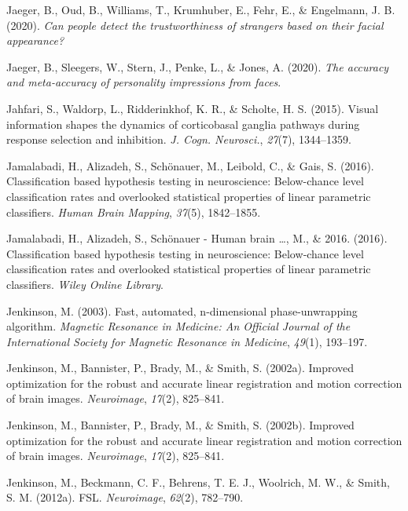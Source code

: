 \documentclass[11pt,american,a4paper,oneside,]{memoir} %
\begin{document}
\leavevmode\hypertarget{ref-Jaeger2020-sr}{}%
Jaeger, B., Oud, B., Williams, T., Krumhuber, E., Fehr, E., \& Engelmann, J. B. (2020). \emph{Can people detect the trustworthiness of strangers based on their facial appearance?}

\leavevmode\hypertarget{ref-Jaeger2020-bn}{}%
Jaeger, B., Sleegers, W., Stern, J., Penke, L., \& Jones, A. (2020). \emph{The accuracy and meta-accuracy of personality impressions from faces}.

\leavevmode\hypertarget{ref-Jahfari2015-ix}{}%
Jahfari, S., Waldorp, L., Ridderinkhof, K. R., \& Scholte, H. S. (2015). Visual information shapes the dynamics of corticobasal ganglia pathways during response selection and inhibition. \emph{J. Cogn. Neurosci.}, \emph{27}(7), 1344--1359.

\leavevmode\hypertarget{ref-jamalabadi2016classification}{}%
Jamalabadi, H., Alizadeh, S., Schönauer, M., Leibold, C., \& Gais, S. (2016). Classification based hypothesis testing in neuroscience: Below-chance level classification rates and overlooked statistical properties of linear parametric classifiers. \emph{Human Brain Mapping}, \emph{37}(5), 1842--1855.

\leavevmode\hypertarget{ref-Jamalabadi2016-gr}{}%
Jamalabadi, H., Alizadeh, S., Schönauer - Human brain \ldots, M., \& 2016. (2016). Classification based hypothesis testing in neuroscience: Below‐chance level classification rates and overlooked statistical properties of linear parametric classifiers. \emph{Wiley Online Library}.

\leavevmode\hypertarget{ref-jenkinson2003fast}{}%
Jenkinson, M. (2003). Fast, automated, n-dimensional phase-unwrapping algorithm. \emph{Magnetic Resonance in Medicine: An Official Journal of the International Society for Magnetic Resonance in Medicine}, \emph{49}(1), 193--197.

\leavevmode\hypertarget{ref-jenkinson2002improved}{}%
Jenkinson, M., Bannister, P., Brady, M., \& Smith, S. (2002a). Improved optimization for the robust and accurate linear registration and motion correction of brain images. \emph{Neuroimage}, \emph{17}(2), 825--841.

\leavevmode\hypertarget{ref-Jenkinson2002-wm}{}%
Jenkinson, M., Bannister, P., Brady, M., \& Smith, S. (2002b). Improved optimization for the robust and accurate linear registration and motion correction of brain images. \emph{Neuroimage}, \emph{17}(2), 825--841.

\leavevmode\hypertarget{ref-Jenkinson2012-ui}{}%
Jenkinson, M., Beckmann, C. F., Behrens, T. E. J., Woolrich, M. W., \& Smith, S. M. (2012a). FSL. \emph{Neuroimage}, \emph{62}(2), 782--790.
\end{document}
